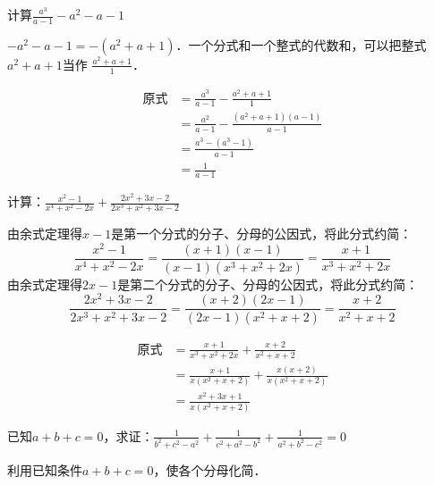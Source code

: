 \begin{example}
    计算$\frac{a^3}{a-1}-a^2-a-1$
\end{example}

\begin{analyze}
    $-a^2-a-1=-(a^2+a+1)$．一个分式和一个整式的代数和，可以把整式$a^2+a+1$当作
    $\frac{a^2+a+1}{1}$．
\end{analyze}

\begin{solution}
    \[\begin{split}
        \text{原式}&=\frac{a^3}{a-1}-\frac{a^2+a+1}{1}   \\
        &=  \frac{a^2}{a-1}-\frac{(a^2+a+1)(a-1)}{a-1}           \\
        &=\frac{a^3-(a^3-1)}{a-1}\\
        &=\frac{1}{a-1}
    \end{split}\]
\end{solution}


\begin{example}
计算：$\frac{x^2-1}{x^4+x^2-2x}+\frac{2x^2+3x-2}{2x^3+x^2+3x-2}$
\end{example}

\begin{analyze}
由余式定理得$x-1$是第一个分式的分子、分母的公因式，将此分式约简：
\[\frac{x^2-1}{x^4+x^2-2x}=\frac{(x+1)(x-1)}{(x-1)(x^3+x^2+2x)}=\frac{x+1}{x^3+x^2+2x}\]
由余式定理得$2x-1$是第二个分式的分子、分母的公因式，将此分式约简：
\[\frac{2x^2+3x-2}{2x^3+x^2+3x-2}=\frac{(x+2)(2x-1)}{(2x-1)(x^2+x+2)}=\frac{x+2}{x^2+x+2}\]
\end{analyze}

\begin{solution}
\[\begin{split}
    \text{原式}&=\frac{x+1}{x^3+x^2+2x}+ \frac{x+2}{x^2+x+2}  \\
    &= \frac{x+1}{x(x^2+x+2)}+ \frac{x(x+2)}{x(x^2+x+2)}   \\
    &=\frac{x^2+3x+1}{x(x^2+x+2)}
\end{split}\] 
\end{solution}

\begin{example}
    已知$a+b+c=0$，求证：$\frac{1}{b^2+c^2-a^2}+\frac{1}{c^2+a^2-b^2}+\frac{1}{a^2+b^2-c^2}=0$
\end{example}

\begin{analyze}
利用已知条件$a+b+c=0$，使各个分母化简．
\end{analyze}


